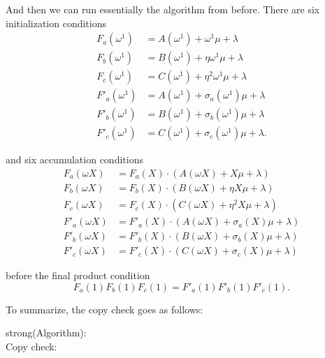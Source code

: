 And then we can run essentially the algorithm from before. There are six
initialization conditions \[\begin{aligned}
F_{a}\left( \omega^{1} \right) & = A\left( \omega^{1} \right) + \omega^{1}\mu + \lambda \\
F_{b}\left( \omega^{1} \right) & = B\left( \omega^{1} \right) + \eta\omega^{1}\mu + \lambda \\
F_{c}\left( \omega^{1} \right) & = C\left( \omega^{1} \right) + \eta^{2}\omega^{1}\mu + \lambda \\
F'_{a}\left( \omega^{1} \right) & = A\left( \omega^{1} \right) + \sigma_{a}\left( \omega^{1} \right)\mu + \lambda \\
F'_{b}\left( \omega^{1} \right) & = B\left( \omega^{1} \right) + \sigma_{b}\left( \omega^{1} \right)\mu + \lambda \\
F'_{c}\left( \omega^{1} \right) & = C\left( \omega^{1} \right) + \sigma_{c}\left( \omega^{1} \right)\mu + \lambda.
\end{aligned}\] \label{copycheck-init}{}

and six accumulation conditions \[\begin{aligned}
F_{a}(\omega X) & = F_{a}(X) \cdot \left( A(\omega X) + X\mu + \lambda \right) \\
F_{b}(\omega X) & = F_{b}(X) \cdot \left( B(\omega X) + \eta X\mu + \lambda \right) \\
F_{c}(\omega X) & = F_{c}(X) \cdot \left( C(\omega X) + \eta^{2}X\mu + \lambda \right) \\
F'_{a}(\omega X) & = F'_{a}(X) \cdot \left( A(\omega X) + \sigma_{a}(X)\mu + \lambda \right) \\
F'_{b}(\omega X) & = F'_{b}(X) \cdot \left( B(\omega X) + \sigma_{b}(X)\mu + \lambda \right) \\
F'_{c}(\omega X) & = F'_{c}(X) \cdot \left( C(\omega X) + \sigma_{c}(X)\mu + \lambda \right)
\end{aligned}\] \label{copycheck-accum}{}

before the final product condition
\[F_{a}(1)F_{b}(1)F_{c}(1) = F'_{a}(1)F'_{b}(1)F'_{c}(1).\]
\label{copycheck-final}{}

To summarize, the copy check goes as follows:

strong(Algorithm):\\
Copy check:

